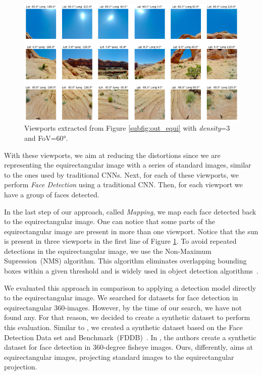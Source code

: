 \begin{figure}[!ht]
    \centering
    \includegraphics[width=1\linewidth]{img/video360/viewports.png}
    \caption{Viewports extracted from Figure \ref{subfig:out_equi} with \emph{density}=3 and FoV=60°.}
    \label{fig:authoring_viewports}
\end{figure}

With these viewports, we aim at reducing the distortions since we are representing the equirectangular image with a series of standard images, similar to the ones used by traditional CNNs. Next, for each of these viewports, we perform \emph{Face Detection} using a traditional CNN. Then, for each viewport we have a group of faces detected.

In the last step of our approach, called \emph{Mapping}, we map each face detected back to the equirectangular image. One can notice that some parts of the equirectangular image are present in more than one viewport. Notice that the sun is present in three viewports in the first line of Figure \ref{fig:authoring_viewports}. To avoid repeated detections in the equirectangular image, we use the Non-Maximum Supression~(NMS) algorithm. This algorithm eliminates overlapping bounding boxes within a given threshold and is widely used in object detection algorithms~\cite{nms1, nms2, nms3, nms4, nms5}.

We evaluated this approach in comparison to applying a detection model directly to the equirectangular image. We searched for datasets for face detection in equirectangular 360-images. However, by the time of our search, we have not found any. For that reason, we decided to create a synthetic dataset to perform this evaluation. 
Similar to \cite{fu2019fddb}, we created a synthetic dataset based on the Face Detection Data set and Benchmark~(FDDB)~\cite{jain2010fddb}. In \cite{fu2019fddb}, the authors create a synthetic dataset for face detection in 360-degree fisheye images. Ours, differently, aims at equirectangular images, projecting standard images to the equirectangular projection.

